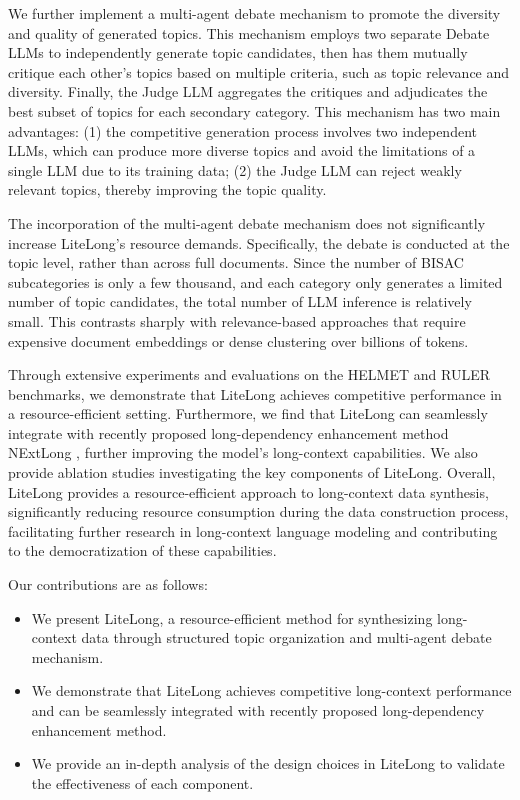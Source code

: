 \documentclass{article}
\theoremstyle{plain}
\theoremstyle{definition}
\theoremstyle{remark}
\begin{document}
    We further implement a multi-agent debate \cite{du2023improving, kenton2024on} mechanism to promote the diversity and quality of generated topics. This mechanism employs two separate Debate LLMs to independently generate topic candidates, then has them mutually critique each other's topics based on multiple criteria, such as topic relevance and diversity. Finally, the Judge LLM aggregates the critiques and adjudicates the best subset of topics for each secondary category. This mechanism has two main advantages: (1) the competitive generation process involves two independent LLMs, which can produce more diverse topics and avoid the limitations of a single LLM due to its training data; (2) the Judge LLM can reject weakly relevant topics, thereby improving the topic quality.

    The incorporation of the multi-agent debate mechanism does not significantly increase LiteLong's resource demands. Specifically, the debate is conducted at the topic level, rather than across full documents. Since the number of BISAC subcategories is only a few thousand, and each category only generates a limited number of topic candidates, the total number of LLM inference is relatively small. This contrasts sharply with relevance-based approaches that require expensive document embeddings or dense clustering over billions of tokens. 
    
    Through extensive experiments and evaluations on the HELMET \cite{yen2025helmet} and RULER \cite{hsieh2024ruler} benchmarks, we demonstrate that LiteLong achieves competitive performance in a resource-efficient setting. Furthermore, we find that LiteLong can seamlessly integrate with recently proposed long-dependency enhancement method NExtLong \cite{gao2025nextlong}, further improving the model's long-context capabilities. We also provide ablation studies investigating the key components of LiteLong. Overall, LiteLong provides a resource-efficient approach to long-context data synthesis, significantly reducing resource consumption during the data construction process, facilitating further research in long-context language modeling and contributing to the democratization of these capabilities.

    Our contributions are as follows:
    \begin{itemize}
        \item We present LiteLong, a resource-efficient method for synthesizing long-context data through structured topic organization and multi-agent debate mechanism.
        \item We demonstrate that LiteLong achieves competitive long-context performance and can be seamlessly integrated with recently proposed long-dependency enhancement method.
        \item We provide an in-depth analysis of the design choices in LiteLong to validate the effectiveness of each component.
    \end{itemize}
    
\end{document}
